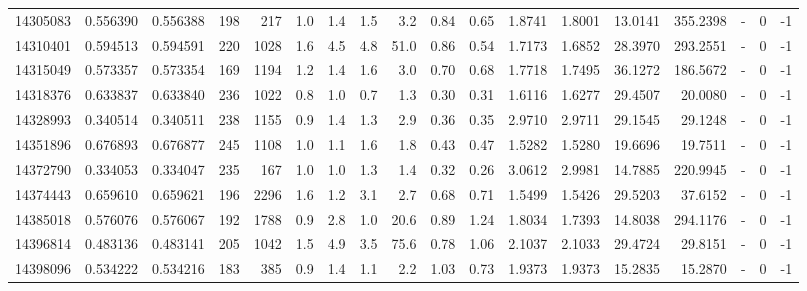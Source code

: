 \begin{tabular}{rrrrrrrrrrrrrrrlrr}
  14305083 & 0.556390 &   0.556388 &  198 &  217 &      1.0 &      1.4 &     1.5 &      3.2 &       0.84 &        0.65 &  1.8741 &  1.8001 &   13.0141 &  355.2398 &             - &        0 &         -1 \\
  14310401 & 0.594513 &   0.594591 &  220 & 1028 &      1.6 &      4.5 &     4.8 &     51.0 &       0.86 &        0.54 &  1.7173 &  1.6852 &   28.3970 &  293.2551 &             - &        0 &         -1 \\
  14315049 & 0.573357 &   0.573354 &  169 & 1194 &      1.2 &      1.4 &     1.6 &      3.0 &       0.70 &        0.68 &  1.7718 &  1.7495 &   36.1272 &  186.5672 &             - &        0 &         -1 \\
  14318376 & 0.633837 &   0.633840 &  236 & 1022 &      0.8 &      1.0 &     0.7 &      1.3 &       0.30 &        0.31 &  1.6116 &  1.6277 &   29.4507 &   20.0080 &             - &        0 &         -1 \\
  14328993 & 0.340514 &   0.340511 &  238 & 1155 &      0.9 &      1.4 &     1.3 &      2.9 &       0.36 &        0.35 &  2.9710 &  2.9711 &   29.1545 &   29.1248 &             - &        0 &         -1 \\
  14351896 & 0.676893 &   0.676877 &  245 & 1108 &      1.0 &      1.1 &     1.6 &      1.8 &       0.43 &        0.47 &  1.5282 &  1.5280 &   19.6696 &   19.7511 &             - &        0 &         -1 \\
  14372790 & 0.334053 &   0.334047 &  235 &  167 &      1.0 &      1.0 &     1.3 &      1.4 &       0.32 &        0.26 &  3.0612 &  2.9981 &   14.7885 &  220.9945 &             - &        0 &         -1 \\
  14374443 & 0.659610 &   0.659621 &  196 & 2296 &      1.6 &      1.2 &     3.1 &      2.7 &       0.68 &        0.71 &  1.5499 &  1.5426 &   29.5203 &   37.6152 &             - &        0 &         -1 \\
  14385018 & 0.576076 &   0.576067 &  192 & 1788 &      0.9 &      2.8 &     1.0 &     20.6 &       0.89 &        1.24 &  1.8034 &  1.7393 &   14.8038 &  294.1176 &             - &        0 &         -1 \\
  14396814 & 0.483136 &   0.483141 &  205 & 1042 &      1.5 &      4.9 &     3.5 &     75.6 &       0.78 &        1.06 &  2.1037 &  2.1033 &   29.4724 &   29.8151 &             - &        0 &         -1 \\
  14398096 & 0.534222 &   0.534216 &  183 &  385 &      0.9 &      1.4 &     1.1 &      2.2 &       1.03 &        0.73 &  1.9373 &  1.9373 &   15.2835 &   15.2870 &             - &        0 &         -1 \\

\end{tabular}
